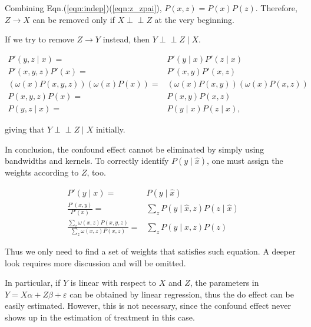 \documentclass[a4 paper,12pt]{article}
\newcommand{\indep}{\perp \!\!\! \perp}
\begin{document}
Combining Eqn.(\ref{eqn:indep})(\ref{eqn:z_zpai}), $P(x,z)=P(x)P(z)$.
Therefore, $Z\to X$ can be removed only if $X\indep Z$ at the very beginning.

If we try to remove $Z\to Y$ instead, then $Y\indep Z\mid X$.

\begin{align}
   P'(y,z\mid x)=&P'(y\mid x)P'(z\mid x)\\
   P'(x,y,z)P'(x)=&P'(x,y)P'(x,z)\\
   (\omega(x)P(x,y,z))(\omega(x)P(x))=&(\omega(x)P(x,y))(\omega(x)P(x,z))\\
   P(x,y,z)P(x)=&P(x,y)P(x,z)\\
   P(y,z\mid x)=&P(y\mid x)P(z\mid x),
\end{align}

giving that $Y\indep Z\mid X$ initially.

In conclusion, the confound effect cannot be eliminated by simply using bandwidths and kernels.
To correctly identify $P(y\mid\hat x)$,
one must assign the weights according to $Z$, too.

\begin{align}
   P'(y\mid x)=&P(y\mid \hat x)\\
   \frac{P'(x,y)}{P'(x)}=&\sum_z P(y\mid \hat x,z)P(z\mid \hat x)\\
   \frac{\sum_z \omega(x,z)P(x,y,z)}{\sum_z \omega(x,z)P(x,z)}=&\sum_z P(y\mid x,z)P(z)
\end{align}

Thus we only need to find a set of weights that satisfies such equation.
A deeper look requires more discussion and will be omitted.

In particular,
if $Y$ is linear with respect to $X$ and $Z$,
the parameters in $Y=X\alpha+Z\beta+\varepsilon$ can be obtained by linear regression,
thus the do effect can be easily estimated.
However, this is not necessary, since the confound effect never shows up in the estimation of treatment in this case.
\end{document}
